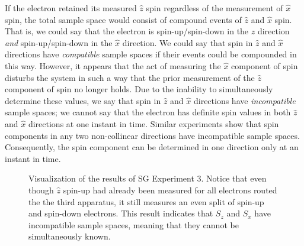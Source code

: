 If the electron retained its measured $\hat{z}$ spin regardless of the measurement of $\hat{x}$ spin, the total sample space would consist of compound events of $\hat{z}$ and $\hat{x}$ spin. That is, we could say that the electron is spin-up/spin-down in the $\hat{z}$ direction \textit{and} spin-up/spin-down in the $\hat{x}$ direction. We could say that spin in $\hat{z}$ and $\hat{x}$ directions have \textit{compatible} sample spaces if their events could be compounded in this way. However, it appears that the act of measuring the $\hat{x}$ component of spin disturbs the system in such a way that the prior measurement of the $\hat{z}$ component of spin no longer holds. Due to the inability to simultaneously determine these values, we say that spin in $\hat{z}$ and $\hat{x}$ directions have \textit{incompatible} sample spaces; we cannot say that the electron has definite spin values in both $\hat{z}$ and $\hat{x}$ directions at one instant in time. Similar experiments show that spin components in any two non-collinear directions have incompatible sample spaces. Consequently, the spin component can be determined in one direction only at an instant in time.

\begin{figure}
\centering\CaptionFontSize
{}

\caption[Insert an abbreviated caption here to show in the List of Figures]
{Visualization of the results of SG Experiment 3. Notice that even though $\hat{z}$ spin-up had already been measured for all electrons routed the the third apparatus, it still measures an even split of spin-up and spin-down electrons. This result indicates that $S_z$ and $S_x$ have incompatible sample spaces, meaning that they cannot be simultaneously known. }
\label{Figure:Exp 3}
\end{figure}
